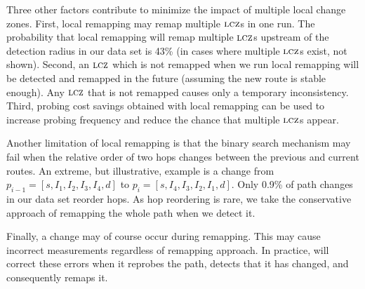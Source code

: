 

Three other factors contribute to minimize the impact of multiple local
change zones.  First, local remapping may remap multiple
$\mathrm{\textsc{lcz}}$s in one run.  The probability that local remapping will remap 
multiple $\mathrm{\textsc{lcz}}$s upstream of the detection radius in our data set
is 43\% (in cases where multiple $\mathrm{\textsc{lcz}}$s exist, not shown).  Second, an
$\mathrm{\textsc{lcz}}$ which is not remapped when we run local remapping will be
detected and remapped in the future (assuming the new route is stable
enough).  Any $\mathrm{\textsc{lcz}}$ that is not remapped causes only a temporary
inconsistency.  Third, probing cost savings obtained with local
remapping can be used to increase probing frequency and reduce the
chance that multiple $\mathrm{\textsc{lcz}}$s appear.

Another limitation of local remapping is that the binary search
mechanism may fail when the relative order of two hops changes between
the previous and current routes.  An extreme, but illustrative, example
is a change from $p_{i-1} = [s, I_1, I_2, I_3, I_4, d]$ to $p_i =
[s, I_4, I_3, I_2, I_1, d]$.  Only 0.9\% of path changes in our data set
reorder hops.  As hop reordering is rare, we take the conservative
approach of remapping the whole path when we detect it. 

Finally, a change may of course occur during remapping.  
This may cause incorrect measurements regardless of remapping approach.  
In practice, \dtrack{} will correct these errors when it reprobes the path, detects that it has
changed, and consequently remaps it.
